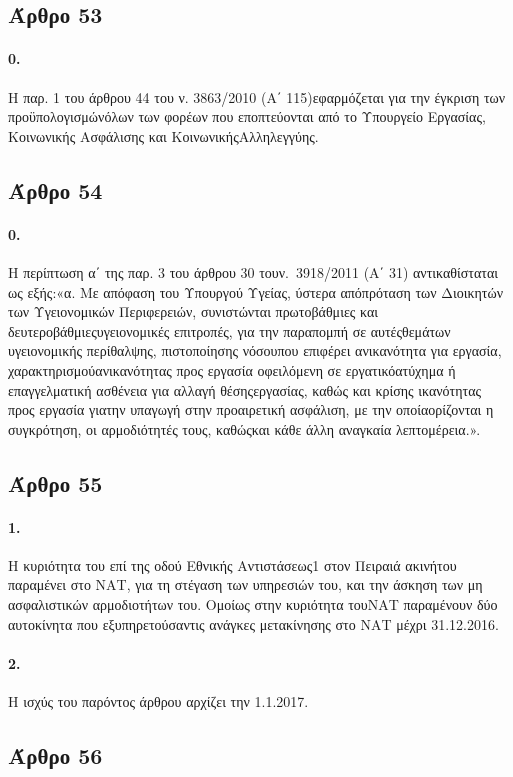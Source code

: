 \documentclass[a4paper,oneside, 10pt]{book}
\begin{document}
\subsection*{ Άρθρο 53 }
\paragraph { 0. } Η παρ. 1 του άρθρου 44 του ν. 3863/2010 (Α΄ 115)εφαρμόζεται για την έγκριση των προϋπολογισμώνόλων των φορέων που εποπτεύονται από το Υπουργείο Εργασίας, Κοινωνικής Ασφάλισης και ΚοινωνικήςΑλληλεγγύης.
\subsection*{ Άρθρο 54 }
\paragraph { 0. } Η περίπτωση α΄ της παρ. 3 του άρθρου 30 τουν. 3918/2011 (Α΄ 31) αντικαθίσταται ως εξής:«α. Με απόφαση του Υπουργού Υγείας, ύστερα απόπρόταση των Διοικητών των Υγειονομικών Περιφερειών, συνιστώνται πρωτοβάθμιες και δευτεροβάθμιεςυγειονομικές επιτροπές, για την παραπομπή σε αυτέςθεμάτων υγειονομικής περίθαλψης, πιστοποίησης νόσουπου επιφέρει ανικανότητα για εργασία, χαρακτηρισμούανικανότητας προς εργασία οφειλόμενη σε εργατικόατύχημα ή επαγγελματική ασθένεια για αλλαγή θέσηςεργασίας, καθώς και κρίσης ικανότητας προς εργασία γιατην υπαγωγή στην προαιρετική ασφάλιση, με την οποίαορίζονται η συγκρότηση, οι αρμοδιότητές τους, καθώςκαι κάθε άλλη αναγκαία λεπτομέρεια.».
\subsection*{ Άρθρο 55 }
\paragraph { 1. } Η κυριότητα του επί της οδού Εθνικής Αντιστάσεως1 στον Πειραιά ακινήτου παραμένει στο ΝΑΤ, για τη στέγαση των υπηρεσιών του, και την άσκηση των μη ασφαλιστικών αρμοδιοτήτων του. Ομοίως στην κυριότητα τουΝΑΤ παραμένουν δύο αυτοκίνητα που εξυπηρετούσαντις ανάγκες μετακίνησης στο ΝΑΤ μέχρι 31.12.2016.
\paragraph { 2. } Η ισχύς του παρόντος άρθρου αρχίζει την 1.1.2017.
\subsection*{ Άρθρο 56 }
\end{document}
